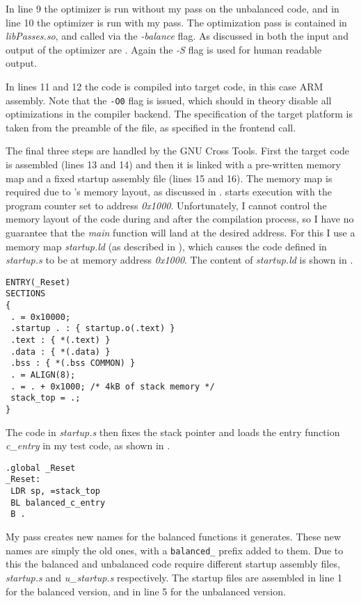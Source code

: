 In line 9 the \llvm{} optimizer is run without my pass on the unbalanced code, and in line 10 the optimizer is run with my pass.
The optimization pass is contained in \emph{libPasses.so}, and called via the \emph{-balance} flag.
As discussed in  both the input and output of the optimizer are \ir{}.
Again the \emph{-S} flag is used for human readable output.

In lines 11 and 12 the \ir{} code is compiled into target code, in this case ARM assembly.
Note that the \texttt{-O0} flag is issued, which should in theory disable all optimizations in the compiler backend.
The specification of the target platform is taken from the preamble of the \ir{} file, as specified in the frontend call.

The final three steps are handled by the GNU Cross Tools.
First the target code is assembled (lines 13 and 14) and then it is linked with a pre-written memory map and a fixed startup assembly file (lines 15 and 16).
The memory map is required due to \qemu{}'s memory layout, as discussed in .
\qemu{} starts execution with the program counter set to address \emph{0x1000}.
Unfortunately, I cannot control the memory layout of the code during and after the compilation process, so I have no guarantee that the \emph{main} function will land at the desired address.
For this I use a memory map \emph{startup.ld} (as described in \cite{armbare}), which causes the code defined in \emph{startup.s} to be at memory address \emph{0x1000}.
The content of \emph{startup.ld} is shown in .

\begin{lstlisting}[caption=Memory map in \emph{startup.ld}, label=lst:mmap]
ENTRY(_Reset)
SECTIONS
{
 . = 0x10000;
 .startup . : { startup.o(.text) }
 .text : { *(.text) }
 .data : { *(.data) }
 .bss : { *(.bss COMMON) }
 . = ALIGN(8);
 . = . + 0x1000; /* 4kB of stack memory */
 stack_top = .;
}
\end{lstlisting}

The code in \emph{startup.s} then fixes the stack pointer and loads the entry function \emph{c\_entry} in my test code, as shown in .

\begin{lstlisting}[caption=Startup assembly code, label=lst:startup]
.global _Reset
_Reset:
 LDR sp, =stack_top
 BL balanced_c_entry
 B .
\end{lstlisting}

My pass creates new names for the balanced functions it generates.
These new names are simply the old ones, with a \texttt{balanced\_} prefix added to them.
Due to this the balanced and unbalanced code require different startup assembly files, \emph{startup.s} and \emph{u\_startup.s} respectively.
The startup files are assembled in line 1 for the balanced version, and in line 5 for the unbalanced version.

